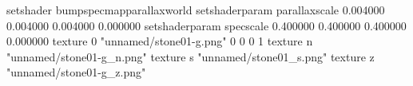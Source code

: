 setshader bumpspecmapparallaxworld
setshaderparam parallaxscale 0.004000 0.004000 0.004000 0.000000
setshaderparam specscale 0.400000 0.400000 0.400000 0.000000
texture 0 "unnamed/stone01-g.png" 0 0 0 1
texture n "unnamed/stone01-g_n.png"
texture s "unnamed/stone01_s.png"
texture z "unnamed/stone01-g_z.png"